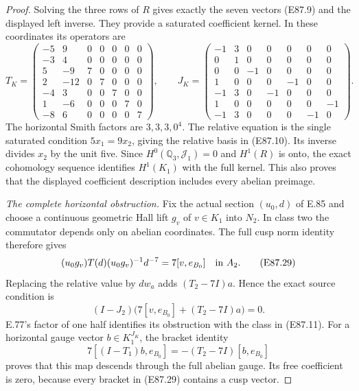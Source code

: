 \begin{proof}
Solving the three rows of $R$ gives exactly the
seven vectors (E87.9) and the displayed left
inverse. They provide a saturated coefficient
kernel. In these coordinates its operators are
\[
 T_K=\begin{pmatrix}
 -5&9&0&0&0&0&0\\-3&4&0&0&0&0&0\\
 5&-9&7&0&0&0&0\\2&-12&0&7&0&0&0\\
 -4&3&0&0&7&0&0\\1&-6&0&0&0&7&0\\
 -8&6&0&0&0&0&7
 \end{pmatrix},\qquad
 J_K=\begin{pmatrix}
 -1&3&0&0&0&0&0\\0&1&0&0&0&0&0\\
 0&0&-1&0&0&0&0\\1&0&0&0&-1&0&0\\
 -1&3&0&-1&0&0&0\\1&0&0&0&0&0&-1\\
 -1&3&0&0&0&-1&0
 \end{pmatrix}.
 \tag{E87.28}
\]
The horizontal Smith factors are $3,3,3,0^4$.
The relative equation is the single saturated
condition $5x_1=9x_2$, giving the relative basis
in (E87.10). Its inverse divides $x_2$ by the
unit five. Since $H^0(\mathbb Q_3,\mathcal J_1)=0$
and $H^1(R)$ is onto, the exact cohomology sequence
identifies $H^1(K_1)$ with the full kernel.
This also proves that the displayed coefficient
description includes every abelian preimage.

\emph{The complete horizontal obstruction.}
Fix the actual section $(u_0,d)$ of E.85 and
choose a continuous geometric Hall lift $g_v$
of $v\in K_1$ into $N_2$. In class two the
commutator depends only on abelian coordinates.
The full cusp norm identity therefore gives
\[
 (u_0g_v)T(d)(u_0g_v)^{-1}d^{-7}
                         =7[v,e_{B_0}]\quad\hbox{in }A_2.
 \tag{E87.29}
\]
Replacing the relative value by $d w_a$ adds
$(T_2-7I)a$. Hence the exact source condition is
\[
 (I-J_2)\bigl(7[v,e_{B_0}]+(T_2-7I)a\bigr)=0.
 \tag{E87.30}
\]
E.77's factor of one half identifies its
obstruction with the class in (E87.11).
For a horizontal gauge vector $b\in K_1^{J_K}$,
the bracket identity
\[
 7[(I-T_1)b,e_{B_0}]
            =-(T_2-7I)[b,e_{B_0}]
 \tag{E87.31}
\]
proves that this map descends through the full
abelian gauge. Its free coefficient is zero,
because every bracket in (E87.29) contains a
cusp vector.


\end{proof}
